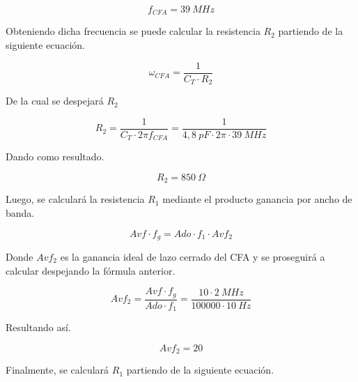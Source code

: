 \documentclass[12pt,A4paper,titlepage]{article}
\begin{document}
\begin{equation}
    \boxed{
        f_{CFA} = 39~MHz
    }
\end{equation}

\bigskip
\hspace{1mm} Obteniendo dicha frecuencia se puede calcular la resistencia \( R_2 \) partiendo de la siguiente ecuación.

\begin{equation}
    \omega _{CFA} = \frac{1}{C_T \cdot R_2}
\end{equation}

\bigskip
\hspace{1mm} De la cual se despejará \( R_2 \)

\begin{equation}
    R_2 = \frac{1}{C_T \cdot 2\pi f_{CFA}} = \frac{1}{4,8~pF \cdot 2\pi \cdot 39~MHz}
\end{equation}

\bigskip
\hspace{1mm} Dando como resultado.

\begin{equation}
    \boxed{
        R_2 = 850~\Omega
    }
\end{equation}

\bigskip
\hspace{1mm} Luego, se calculará la resistencia \( R_1 \) mediante el producto ganancia por ancho de banda.

\begin{equation}
    Avf \cdot f_g = Ado \cdot f_1 \cdot Avf_2
\end{equation}

\bigskip
\hspace{1mm} Donde \( Avf_2 \) es la ganancia ideal de lazo cerrado del CFA y se proseguirá a calcular despejando la fórmula anterior.

\begin{equation}
    Avf_2 = \frac{Avf \cdot f_g}{Ado \cdot f_1} = \frac{10 \cdot 2~MHz}{100000 \cdot 10~Hz}
\end{equation}

\bigskip
\hspace{1mm} Resultando así.

\begin{equation}
    \boxed{
    Avf_2 = 20
    }
\end{equation}

\bigskip
\hspace{1mm} Finalmente, se calculará \( R_1 \) partiendo de la siguiente ecuación.
\end{document}
